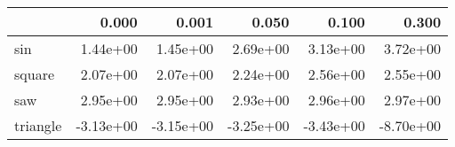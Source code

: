 \begin{tabular}{lrrrrr}
\toprule
{} &     0.000 &     0.001 &     0.050 &     0.100 &     0.300 \\
\midrule
sin      &  1.44e+00 &  1.45e+00 &  2.69e+00 &  3.13e+00 &  3.72e+00 \\
square   &  2.07e+00 &  2.07e+00 &  2.24e+00 &  2.56e+00 &  2.55e+00 \\
saw      &  2.95e+00 &  2.95e+00 &  2.93e+00 &  2.96e+00 &  2.97e+00 \\
triangle & -3.13e+00 & -3.15e+00 & -3.25e+00 & -3.43e+00 & -8.70e+00 \\
\bottomrule
\end{tabular}

